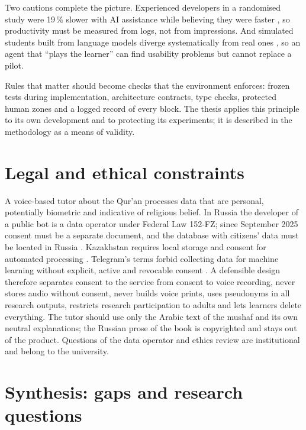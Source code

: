 \documentclass[a4paper,14pt]{extarticle}
\begin{document}
Two cautions complete the picture. Experienced developers in a randomised study were 19\,\% slower with
AI assistance while believing they were faster \cite{SRC-030}, so productivity must be measured from
logs, not from impressions. And simulated students built from language models diverge systematically from
real ones \cite{SRC-083,SRC-085}, so an agent that ``plays the learner'' can find usability problems but
cannot replace a pilot.

\begin{keybox}[Implication]
Rules that matter should become checks that the environment enforces: frozen tests during
implementation, architecture contracts, type checks, protected human zones and a logged record of every
block. The thesis applies this principle to its own development and to protecting its experiments; it is
described in the methodology as a means of validity.
\end{keybox}

\section{Legal and ethical constraints}

A voice-based tutor about the Qur'an processes data that are personal, potentially biometric and
indicative of religious belief. In Russia the developer of a public bot is a data operator under Federal
Law 152-FZ; since September 2025 consent must be a separate document, and the database with citizens'
data must be located in Russia \cite{SRC-036}. Kazakhstan requires local storage and consent for
automated processing \cite{SRC-037}. Telegram's terms forbid collecting data for machine learning without
explicit, active and revocable consent \cite{SRC-033}. A defensible design therefore separates consent
to the service from consent to voice recording, never stores audio without consent, never builds voice
prints, uses pseudonyms in all research outputs, restricts research participation to adults and lets
learners delete everything. The tutor should use only the Arabic text of the mushaf and its own neutral
explanations; the Russian prose of the book is copyrighted and stays out of the product. Questions of
the data operator and ethics review are institutional and belong to the university.

\section{Synthesis: gaps and research questions}
\end{document}
